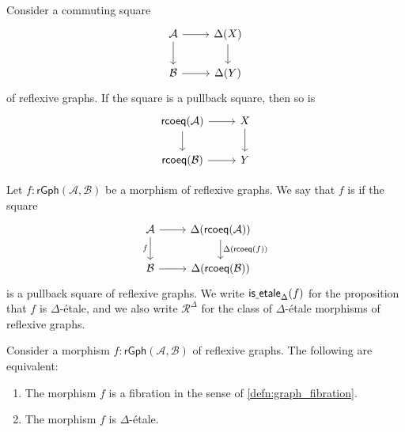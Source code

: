 \begin{prp}\label{prp:rcoeq_flattening}
Consider a commuting square
\begin{equation*}
\begin{tikzcd}
\mathcal{A} \arrow[r] \arrow[d] & \Delta(X) \arrow[d] \\
\mathcal{B} \arrow[r] & \Delta(Y)
\end{tikzcd}
\end{equation*}
of reflexive graphs. If the square is a pullback square, then so is
\begin{equation*}
\begin{tikzcd}
\rcoeq(\mathcal{A}) \arrow[r] \arrow[d] & X \arrow[d] \\
\rcoeq(\mathcal{B}) \arrow[r] & Y
\end{tikzcd}
\end{equation*}
\end{prp}

\begin{defn}
Let $f:\mathsf{rGph}(\mathcal{A},\mathcal{B})$ be a morphism of reflexive graphs. We say that $f$ is  if the square
\begin{equation*}
\begin{tikzcd}
\mathcal{A} \arrow[d,swap,"f"] \arrow[r] & \Delta(\rcoeq(\mathcal{A})) \arrow[d,"\Delta(\rcoeq(f))"] \\
\mathcal{B} \arrow[r] & \Delta(\rcoeq(\mathcal{B}))
\end{tikzcd}
\end{equation*}
is a pullback square of reflexive graphs. We write $\mathsf{is\underline{\ }{}etale}_\Delta(f)$ for the proposition that $f$ is $\Delta$-\'etale, and we also write $\mathcal{R}^\Delta$ for the class of $\Delta$-\'etale morphisms of reflexive graphs.
\end{defn}

\begin{thm}\label{thm:etale_fibration}
Consider a morphism $f:\mathsf{rGph}(\mathcal{A},\mathcal{B})$ of reflexive graphs. The following are equivalent:
\begin{enumerate}
\item The morphism $f$ is a fibration in the sense of \cref{defn:graph_fibration}.
\item The morphism $f$ is $\Delta$-\'etale.
\end{enumerate}
\end{thm}

